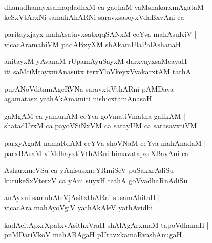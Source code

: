 \documentclass[twoside,12pt,openright]{book}
\newcounter{shloka}[chapter]
\begin{document}
\begin{shloka}%
dhanadhanayxsamaqdadhxM ca gaqhaM vaMshakarxmAgataM |\\
keSxVtArxNi samahAhARNi saravxsasoyxVdaBxvAni ca 
\end{shloka}

\begin{shloka}%
paritayxjayx mahAsatavxsatxqqSANxM ceYva mahAsuKiV |\\
vicacAramahiVM padABxyXM shAkamUlaPalAshanaH
\end{shloka}

\begin{shloka}%
anitayxM yAvanaM rUpamAyuSayxM  darxvayxsaMcayaH |\\
iti saMciMtayxmAnasutx terxYloVkeyxVvakarxtAM tathA 
\end{shloka}

\begin{shloka}%
purANoVditamAgeRVNa saravxtiVthARni pAMDava |\\
agamatasx yathAkAmamiti nishicxtamAnasaH
\end{shloka}

\begin{shloka}%
gaMgAM ca yamunAM ceYva goVmatiVmatha galikAM |\\
shatadUrxM ca payoVSiNxVM ca sarayUM ca sarasavxtiVM 
\end{shloka}

\begin{shloka}%
parxyAgaM namaRdAM ceYVa shoVNaM ceYva mahAnadaM |\\
parxBAsaM viMdhayxtiVthARni himavatapxrXBavAni ca 
\end{shloka}

\begin{shloka}%
AsharxmeVSu ca yAnisusxneYRmiSeV puSakxrAdiSu |\\
kurukeSxVterxV ca yAni suyxH tathA goVvadhaRnAdiSu
\end{shloka}

\begin{shloka}%
anAyxni samuhAteVjAsitxthARni susamAhitaH |\\
vicacAra mahAyoVgiV yathAkAleV yathAvidhi
\end{shloka}

\begin{shloka}%
kadAcitApxrXpatxvAsithxVraH shAlAgArxmaM tapoVdhanaH |\\
puMDariVkoV mahABAgaH pUravxkamaRvashAnugaH 
\end{shloka}
\end{document}

